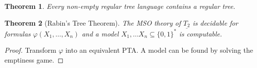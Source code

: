 \documentclass{article}
\newtheorem{theorem}{Theorem}[section]
\begin{document}
\begin{theorem}
	Every non-empty regular tree language contains a regular tree.
\end{theorem}

\begin{theorem}[Rabin's Tree Theorem]
	The MSO theory of $\underline{T_2}$ is decidable for formulas $\varphi(X_1, \dots, X_n)$ and a model $X_1, \dots X_n \subseteq \{0,1\}^*$ is computable.
\end{theorem}
\begin{proof}
	Transform $\varphi$ into an equivalent PTA. A model can be found by solving the emptiness game.
\end{proof}
\end{document}
